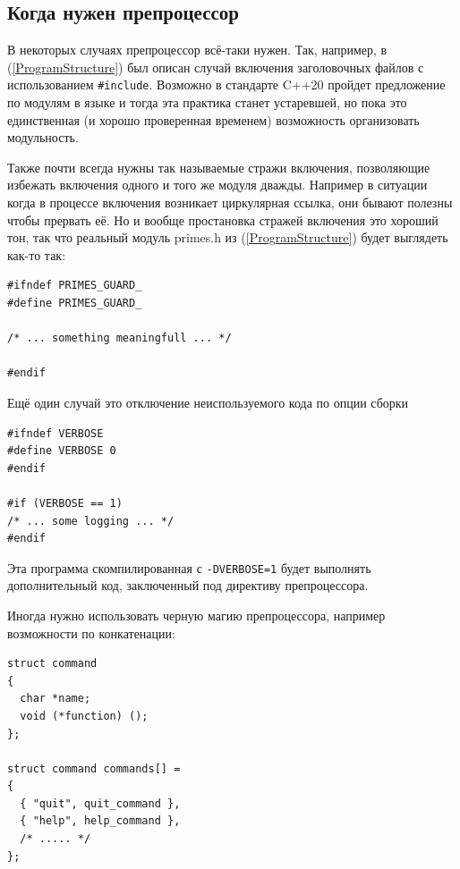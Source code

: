 \documentclass[a4paper,12pt,oneside]{book}
\newif\ifanswers
\begin{document}
\ifanswers
Возможный ответ: разница кроется в семантике статических переменных. Внутри \lstinline!static inline! функций создается столько их копий сколько функций, внутри \lstinline!extern inline! копия одна на всех.
\fi

\subsection{Когда нужен препроцессор}\label{subsub:preprocuses}

В некоторых случаях препроцессор всё-таки нужен. Так, например, в (\ref{ProgramStructure}) был описан случай включения заголовочных файлов с использованием \lstinline!#include!. Возможно в стандарте C++20 пройдет предложение по модулям в языке и тогда эта практика станет устаревшей, но пока это единственная (и хорошо проверенная временем) возможность организовать модульность.

Также почти всегда нужны так называемые стражи включения, позволяющие избежать включения одного и того же модуля дважды. Например в ситуации когда в процессе включения возникает циркулярная ссылка, они бывают полезны чтобы прервать её. Но и вообще простановка стражей включения это хороший тон, так что реальный модуль primes.h из (\ref{ProgramStructure}) будет выглядеть как-то так:

\begin{lstlisting}
#ifndef PRIMES_GUARD_
#define PRIMES_GUARD_

/* ... something meaningfull ... */

#endif
\end{lstlisting}

Ещё один случай это отключение неиспользуемого кода по опции сборки

\begin{lstlisting}
#ifndef VERBOSE
#define VERBOSE 0
#endif

#if (VERBOSE == 1)
/* ... some logging ... */
#endif
\end{lstlisting}

Эта программа скомпилированная с \lstinline!-DVERBOSE=1! будет выполнять дополнительный код, заключенный под директиву препроцессора.

Иногда нужно использовать черную магию препроцессора, например возможности по конкатенации:

\begin{lstlisting}
struct command
{
  char *name;
  void (*function) ();
};
     
struct command commands[] =
{
  { "quit", quit_command },
  { "help", help_command },
  /* ..... */
};
\end{lstlisting}
\end{document}
